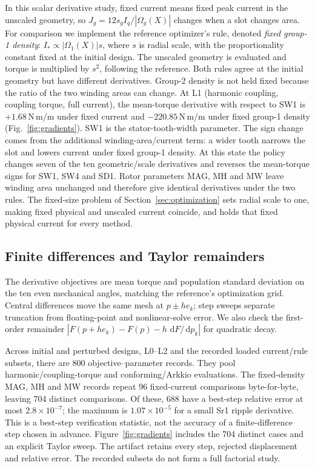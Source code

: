 \documentclass{anvil-paper}
\newcommand{\dd}{\,\mathrm{d}}
\begin{document}
In this scalar derivative study, fixed current means fixed peak current
in the unscaled geometry, so
$J_g=12s_g I_q/|\Omega_g(X)|$ changes when a slot changes area.
For comparison we implement the reference optimizer's rule, denoted
\emph{fixed group-1 density}: $I_*\propto |\Omega_1(X)|s$, where $s$ is
radial scale, with the proportionality constant fixed at the initial
design. The unscaled geometry is evaluated and torque is multiplied by
$s^2$, following the reference. Both rules agree at the initial geometry
but have different derivatives. Group-2 density is not held fixed because
the ratio of the two winding areas can change. At L1 (harmonic coupling,
coupling torque, full current), the mean-torque derivative with respect to SW1 is
$+1.68$\,N\,m/m under fixed current and $-220.85$\,N\,m/m under fixed
group-1 density (Fig.~\ref{fig:gradients}). SW1 is the stator-tooth-width
parameter. The sign change comes from the additional winding-area/current
term: a wider tooth narrows the slot and lowers current under fixed
group-1 density. At this state the policy changes seven of the ten
geometric/scale derivatives and reverses the mean-torque signs for SW1,
SW4 and SD1. Rotor parameters MAG, MH and MW leave winding area unchanged
and therefore give identical derivatives under the two rules. The
fixed-size problem of Section~\ref{sec:optimization} sets radial scale to
one, making fixed physical and unscaled current coincide, and holds that
fixed physical current for every method.

\subsection{Finite differences and Taylor remainders}
The derivative objectives are mean torque and population standard
deviation on the ten even mechanical angles, matching the reference's
optimization grid. Central differences move the same mesh at $p\pm h e_k$;
step sweeps separate truncation from floating-point and nonlinear-solve
error. We also check the first-order remainder
$|F(p+h e_k)-F(p)-h\,\dd F/\dd p_k|$ for quadratic decay.

Across initial and perturbed designs, L0--L2 and the recorded loaded
current/rule subsets, there are 800 objective--parameter records. They pool
harmonic/coupling-torque and conforming/Arkkio evaluations. The fixed-density
MAG, MH and MW records repeat 96 fixed-current comparisons byte-for-byte,
leaving 704 distinct comparisons. Of these, 688 have a best-step relative
error at most $2.8\times10^{-7}$; the maximum is $1.07\times10^{-5}$ for
a small Sr1 ripple derivative. This is a best-step verification statistic,
not the accuracy of a finite-difference step chosen in advance.
Figure~\ref{fig:gradients} includes the 704 distinct cases and an explicit
Taylor sweep. The artifact retains every step, rejected displacement and
relative error. The recorded subsets do not form a full factorial study.
\end{document}

